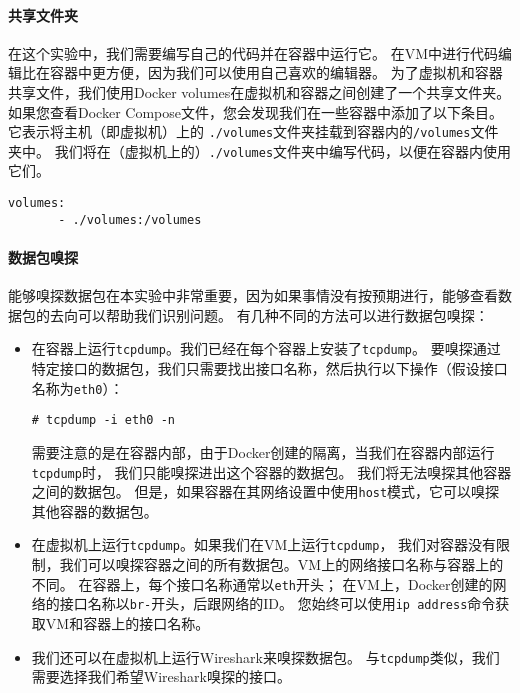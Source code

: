 \paragraph{共享文件夹}
在这个实验中，我们需要编写自己的代码并在容器中运行它。 
在VM中进行代码编辑比在容器中更方便，因为我们可以使用自己喜欢的编辑器。 
为了虚拟机和容器共享文件，我们使用Docker volumes在虚拟机和容器之间创建了一个共享文件夹。 
如果您查看Docker Compose文件，您会发现我们在一些容器中添加了以下条目。 
它表示将主机（即虚拟机）上的 \verb|./volumes|文件夹挂载到容器内的\verb|/volumes|文件夹中。 
我们将在（虚拟机上的）\verb|./volumes|文件夹中编写代码，以便在容器内使用它们。

\begin{lstlisting}
volumes:
       - ./volumes:/volumes
\end{lstlisting}


\paragraph{数据包嗅探}
能够嗅探数据包在本实验中非常重要，因为如果事情没有按预期进行，能够查看数据包的去向可以帮助我们识别问题。
有几种不同的方法可以进行数据包嗅探：

\begin{itemize}
\item 在容器上运行\verb|tcpdump|。我们已经在每个容器上安装了\verb|tcpdump|。 要嗅探通过特定接口的数据包，我们只需要找出接口名称，然后执行以下操作（假设接口名称为\verb|eth0|）：

\begin{lstlisting}
# tcpdump -i eth0 -n
\end{lstlisting}

需要注意的是在容器内部，由于Docker创建的隔离，当我们在容器内部运行\verb|tcpdump|时，
我们只能嗅探进出这个容器的数据包。
我们将无法嗅探其他容器之间的数据包。 
但是，如果容器在其网络设置中使用\verb|host|模式，它可以嗅探其他容器的数据包。
\item 在虚拟机上运行\verb|tcpdump|。如果我们在VM上运行\verb|tcpdump|，
我们对容器没有限制，我们可以嗅探容器之间的所有数据包。VM上的网络接口名称与容器上的不同。
在容器上，每个接口名称通常以\verb|eth|开头； 
在VM上，Docker创建的网络的接口名称以\verb|br-|开头，后跟网络的ID。
您始终可以使用\verb|ip address|命令获取VM和容器上的接口名称。
\item 我们还可以在虚拟机上运行Wireshark来嗅探数据包。
与\verb|tcpdump|类似，我们需要选择我们希望Wireshark嗅探的接口。
\end{itemize}


